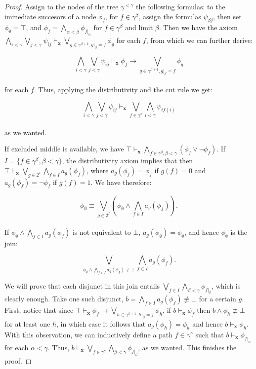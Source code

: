 \documentclass[a4paper,11pt]{article}
\theoremstyle{plain}
\theoremstyle{plain}
\theoremstyle{remark}
\begin{document}
\begin{proof}
Assign to the nodes of the tree $\gamma^{< \gamma}$ the following formulas: to the immediate succesors of a node $\phi_{f}$, for $f \in \gamma^{\beta}$, assign the formulas $\psi_{\beta j}$, then set $\phi_{\emptyset}= \top$, and $\phi_{f}=\bigwedge_{\alpha<\beta}\phi_{f|_{\alpha}}$ for $f \in \gamma^{\beta}$ and limit $\beta$. Then we have the axiom $\bigwedge_{i<\gamma}\bigvee_{j<\gamma} \psi_{ij} \vdash_{\mathbf{x}} \bigvee_{g \in \gamma^{\beta+1}, g|_{\beta}=f} \phi_{g}$ for each $f$, from which we can further derive:

$$\bigwedge_{i<\gamma}\bigvee_{j<\gamma} \psi_{ij} \vdash_{\mathbf{x}} \phi_{f} \to \bigvee_{g \in \gamma^{\beta+1}, g|_{\beta}=f} \phi_{g}$$
\\
for each $f$. Thus, applying the distributivity and the cut rule we get:

$$\bigwedge_{i<\gamma}\bigvee_{j<\gamma} \psi_{ij} \vdash_{\mathbf{x}} \bigvee_{f \in \gamma^{\gamma}}\bigwedge_{i<\gamma} \psi_{if(i)}$$
\\
as we wanted.

If excluded middle is available, we have $\top \vdash_{\mathbf{x}} \bigwedge_{f \in \gamma^{\beta}, \beta<\gamma} (\phi_f \vee \neg \phi_f)$. If $I=\{f \in \gamma^{\beta}, \beta<\gamma\}$, the distributivity axiom implies that then $\top \vdash_{\mathbf{x}} \bigvee_{g \in 2^I} \bigwedge_{f \in I} a_g(\phi_f)$, where $a_g(\phi_f)=\phi_f$ if $g(f)=0$ and $a_g(\phi_f)=\neg \phi_f$ if $g(f)=1$. We have therefore:

$$\phi_{\emptyset} \equiv \bigvee_{g \in 2^I} \left(\phi_{\emptyset} \wedge \bigwedge_{f \in I} a_g(\phi_f)\right).$$
\\
If $\phi_{\emptyset} \wedge \bigwedge_{f \in I} a_g(\phi_f)$ is not equivalent to $\bot$, $a_g(\phi_{\emptyset})=\phi_{\emptyset}$, and hence $\phi_{\emptyset}$ is the join:

$$\bigvee_{\phi_{\emptyset} \wedge \bigwedge_{f \in I} a_g(\phi_f) \not\equiv \bot} \bigwedge_{f \in I} a_g(\phi_f).$$

We will prove that each disjunct in this join entails $\bigvee_{f \in I} \bigwedge_{\beta<\gamma}\phi_{f|_{\beta}}$, which is clearly enough. Take one such disjunct, $b=\bigwedge_{f \in I} a_g(\phi_f) \not\equiv \bot$ for a certain $g$. First, notice that since $\top \vdash_{\mathbf{x}} \phi_{f} \to \bigvee_{h \in \gamma^{\beta+1}, h|_{\beta}=f} \phi_{h}$, if $b \vdash_{\mathbf{x}} \phi_{f}$ then $b \wedge \phi_h \not\equiv \bot$ for at least one $h$, in which case it follows that $a_g(\phi_h)=\phi_h$ and hence $b \vdash_{\mathbf{x}} \phi_h$. With this observation, we can inductively define a path $f \in \gamma^{\gamma}$ such that $b \vdash_{\mathbf{x}} \phi_{f|_{\alpha}}$ for each $\alpha<\gamma$. Thus, $b \vdash_{\mathbf{x}} \bigvee_{f \in \gamma^{\gamma}} \bigwedge_{\beta<\gamma}\phi_{f|_{\beta}}$, as we wanted. This finishes the proof.

\end{proof}
\end{document}
